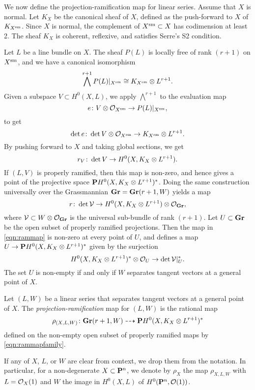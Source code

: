 We now define the projection-ramification map for linear series.
Assume that $X$ is normal.
Let $K_X$ be the canonical sheaf of $X$, defined as the push-forward to $X$ of $K_{X^{\rm sm}}$.
Since $X$ is normal, the complement of $X^{\rm sm} \subset X$ has codimension at least 2.
The sheaf $K_X$ is coherent, reflexive, and satisfies Serre's S2 condition.

Let $L$ be a line bundle on $X$.
The sheaf $P(L)$ is locally free of rank $(r+1)$ on $X^{\rm sm}$, and we have a canonical isomorphism
\[ \bigwedge^{r+1} P(L) |_{X^{\rm sm}} \cong K_{X^{\rm sm}} \otimes L^{r+1}.\]
Given a subspace $V \subset H^0(X, L)$, we apply $\bigwedge^{r+1}$ to the evaluation map
\[ e \from V \otimes \O_{X^{\rm sm}} \to P(L)|_{X^{\rm sm}},\]
to get
\[ \det e \from \det V \otimes \O_{X^{\rm sm}} \to K_{X^{\rm sm}} \otimes L^{r+1}. \]
By pushing forward to $X$ and taking global sections, we get
\begin{equation}\label{eqn:ramsection}
  r_V \from \det V \to H^0(X, K_X \otimes L^{r+1}).
\end{equation}
If $(L, V)$ is properly ramified, then this map is non-zero, and hence gives a point of the projective space $\P H^0(X, K_X \otimes L^{r+1})^*$.
Doing the same construction universally over the Grassmannian $\Gr = \Gr(r+1, W)$ yields a map
\begin{equation}\label{eqn:rammap}
  r \from \det \mathcal V \to H^0(X, K_X \otimes L^{r+1}) \otimes \O_{\Gr},
\end{equation}
where $\mathcal V \subset W \otimes \O_{\Gr}$ is the universal sub-bundle of rank $(r+1)$.
Let $U \subset \Gr$ be the open subset of properly ramified projections.
Then the map in \eqref{eqn:rammap} is non-zero at every point of $U$, and defines a map $U \to \P H^0(X, K_X \otimes L^{r+1})^*$ given by the surjection
\begin{equation}\label{eqn:rammapfamily}
  H^0(X, K_X \otimes L^{r+1})^* \otimes \O_{U} \to \det \mathcal V|_U^*.
\end{equation}
The set $U$ is non-empty if and only if $W$ separates tangent vectors at a general point of $X$.
\begin{definition}
  \label{def:ProjectionRamification}
  Let $(L, W)$ be a linear series that separates tangent vectors at a general point of $X$.
  The \emph{projection-ramification} map for $(L,W)$ is the rational map
  \[
    \rho_{(X,L,W)} \from \Gr(r+1, W) \dashrightarrow \P H^0(X, K_X \otimes L^{r+1})^*
  \]
  defined on the non-empty open subset of properly ramified maps by \eqref{eqn:rammapfamily}.
\end{definition}
If any of $X$, $L$, or $W$ are clear from context, we drop them from the notation.
In particular, for a non-degenerate $X \subset \P^n$, we denote by $\rho_X$ the map $\rho_{X,L,W}$  with $L = \O_X(1)$ and $W$ the image in $H^0(X, L)$ of $H^0(\P^n, \O(1))$.

